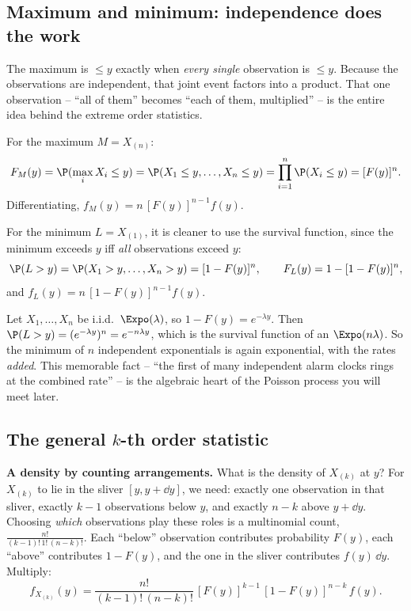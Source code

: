 \subsection{Maximum and minimum: independence does the work}

\begin{intuitionbox}
The maximum is $\le y$ exactly when \emph{every single} observation is $\le y$. Because the
observations are independent, that joint event factors into a product. That one
observation -- ``all of them'' becomes ``each of them, multiplied'' -- is the entire idea
behind the extreme order statistics.
\end{intuitionbox}

For the maximum $M = X_{(n)}$:
\[
  F_M(y) = \P(\max_i X_i \le y) = \P(X_1\le y,\dots,X_n\le y)
         = \prod_{i=1}^n \P(X_i\le y) = [F(y)]^n.
\]
Differentiating, $f_M(y) = n\,[F(y)]^{n-1} f(y)$.

For the minimum $L = X_{(1)}$, it is cleaner to use the survival function, since the
minimum exceeds $y$ iff \emph{all} observations exceed $y$:
\[
  \P(L > y) = \P(X_1 > y,\dots,X_n > y) = [1-F(y)]^n,
  \qquad F_L(y) = 1 - [1-F(y)]^n,
\]
and $f_L(y) = n\,[1-F(y)]^{n-1} f(y)$.

\begin{example}
\label{ch16:min-expo}
Let $X_1,\dots,X_n$ be i.i.d.\ $\Expo(\lambda)$, so $1-F(y)=e^{-\lambda y}$. Then
$\P(L>y) = (e^{-\lambda y})^n = e^{-n\lambda y}$, which is the survival function of an
$\Expo(n\lambda)$. So the minimum of $n$ independent exponentials is again exponential,
with the rates \emph{added}. This memorable fact -- ``the first of many independent alarm
clocks rings at the combined rate'' -- is the algebraic heart of the Poisson process you
will meet later.
\end{example}

\subsection{The general $k$-th order statistic}

\begin{whybox}
\textbf{A density by counting arrangements.} What is the density of $X_{(k)}$ at $y$? For
$X_{(k)}$ to lie in the sliver $[y,y+\dd y]$, we need: exactly one observation in that
sliver, exactly $k-1$ observations below $y$, and exactly $n-k$ above $y+\dd y$. Choosing
\emph{which} observations play these roles is a multinomial count,
$\tfrac{n!}{(k-1)!\,1!\,(n-k)!}$. Each ``below'' observation
contributes probability $F(y)$, each ``above'' contributes $1-F(y)$, and the one in the
sliver contributes $f(y)\,\dd y$. Multiply:
\[
  f_{X_{(k)}}(y) = \frac{n!}{(k-1)!\,(n-k)!}\,[F(y)]^{k-1}\,[1-F(y)]^{n-k}\,f(y).
\]
\end{whybox}

